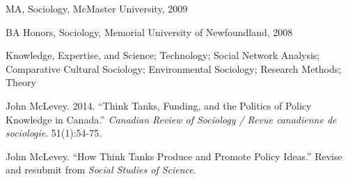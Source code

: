 \documentclass[11pt,usenames,dvipsnames]{article}
\begin{document}


\noindent MA, Sociology, McMaster University, 2009

\noindent BA Honors, Sociology, Memorial University of Newfoundland, 2008 \\



\noindent Knowledge, Expertise, and Science; Technology; Social Network Analysis; Comparative Cultural Sociology; Environmental Sociology; Research Methods; Theory \\




\ind John McLevey. 2014. ``Think Tanks, Funding, and the Politics of Policy Knowledge in Canada.'' \emph{Canadian Review of Sociology / Revue canadienne de sociologie}. 51(1):54-75.\\



\ind John McLevey. ``How Think Tanks Produce and Promote Policy Ideas.'' Revise and resubmit from \emph{Social Studies of Science}. \\
\end{document}
